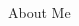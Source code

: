 \documentclass[final,hyperref={pdfpagelabels=false}]{beamer}
\begin{document}
\begin{frame}[t]
\begin{columns}[t]
\begin{column}{.465\textwidth}
\begin{block}{About Me}
\begin{columns}
\end{columns}

\end{block}


\end{column} %

\begin{column}{.015\textwidth}\end{column} %

\end{columns} %

\end{frame} %
\end{document}
